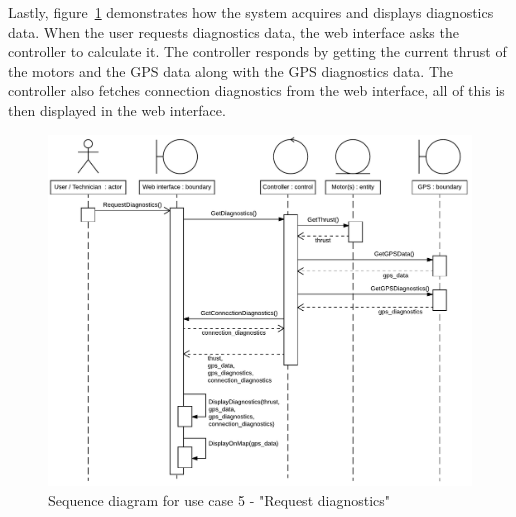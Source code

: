 Lastly, figure~\ref{fig:usecase5sd} demonstrates how the system acquires and displays diagnostics data. When the user requests diagnostics data, the web interface asks the controller to calculate it. The controller responds by getting the current thrust of the motors and the GPS data along with the GPS diagnostics data. The controller also fetches connection diagnostics from the web interface, all of this is then displayed in the web interface.

\begin{figure}[H]
\centering
\includegraphics[width=1\linewidth]{../Appendix/Project/Dokumentation/Images/System_architecture/Use_case_5_SD}
\caption{Sequence diagram for use case 5 - "Request diagnostics"}
\label{fig:usecase5sd}
\end{figure}











